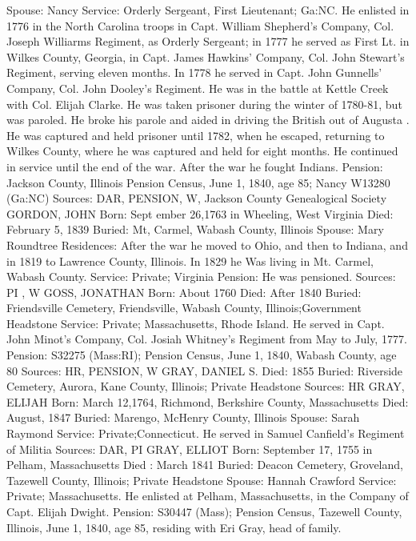 Spouse: Nancy 
Service: Orderly Sergeant, First Lieutenant; Ga:NC. He enlisted in 1776 in the North Carolina troops in Capt. William Shepherd's Company, Col. Joseph Williarms Regiment, as Orderly Sergeant; in 1777 he served as First Lt. in Wilkes County, Georgia, in Capt. James Hawkins' Company, Col. John Stewart's Regiment, serving eleven months. In 1778 he served in Capt. John Gunnells' Company, Col. John Dooley's Regiment. He was in the battle at Kettle Creek with Col. Elijah Clarke. He was taken prisoner during the winter of 1780-81, but was paroled. He broke his parole and aided in driving the British out of Augusta . He was captured and held prisoner until 1782, when he escaped, returning to Wilkes County, where he was captured and held for eight months. He continued in service until the end of the war. After the war he fought Indians. 
Pension: Jackson County, Illinois Pension Census, June 1, 1840, age 85; Nancy W13280 (Ga:NC) 
Sources: DAR, PENSION, W, Jackson County Genealogical Society 
GORDON, JOHN 
Born: Sept ember 26,1763 in Wheeling, West Virginia 
Died: February 5, 1839 
Buried: Mt, Carmel, Wabash County, Illinois 
Spouse: Mary Roundtree 
Residences: After the war he moved to Ohio, and then to Indiana, and in 1819 to Lawrence County, Illinois. In 1829 he Was living in Mt. Carmel, Wabash County. 
Service: Private; Virginia 
Pension: He was pensioned. 
Sources: PI , W 
GOSS, JONATHAN 
Born: About 1760 
Died: After 1840 
Buried: Friendsville Cemetery, Friendsville, Wabash County, Illinois;Government Headstone 
Service: Private; Massachusetts, Rhode Island. He served in Capt. John Minot's Company, Col. Josiah Whitney's Regiment from May to July, 1777. 
Pension: S32275 (Mass:RI); Pension Census, June 1, 1840, Wabash County, age 80 
Sources: HR, PENSION, W 
GRAY, DANIEL S. 
Died: 1855 
Buried: Riverside Cemetery, Aurora, Kane County, Illinois; Private Headstone 
Sources: HR 
GRAY, ELIJAH 
Born: March 12,1764, Richmond, Berkshire County, Massachusetts 
Died: August, 1847 
Buried: Marengo, McHenry County, Illinois 
Spouse: Sarah Raymond 
Service: Private;Connecticut. He served in Samuel Canfield's Regiment of Militia 
Sources: DAR, PI 
GRAY, ELLIOT 
Born: September 17, 1755 in Pelham, Massachusetts 
Died : March 1841 
Buried: Deacon Cemetery, Groveland, Tazewell County, Illinois; Private Head­stone 
Spouse: Hannah Crawford Service: Private; Massachusetts. He enlisted at Pelham, Massachusetts, in the Company of Capt. Elijah Dwight. 
Pension: S30447 (Mass); Pension Census, Tazewell County, Illinois, June 1, 1840, age 85, residing with Eri Gray, head of family. 
